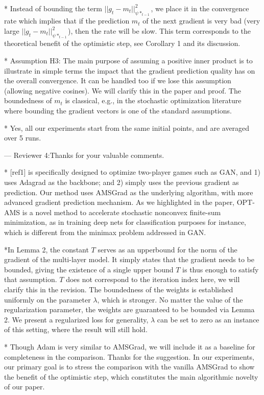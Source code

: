 \documentclass{article}
\begin{document}
* Instead of bounding the term $||g_t  - m_t ||_{\psi*_{t-1}}^2$, we place it in the convergence rate which implies that if the prediction $m_t$ of the next gradient is very bad (very large $||g_t  - m_t ||_{\psi*_{t-1}}^2$), then the rate will be slow. This term corresponds to the theoretical benefit of the optimistic step, see Corollary 1 and its discussion.

* Assumption H3: The main purpose of assuming a positive inner product is to illustrate in simple terms the impact that the gradient prediction quality has on the overall convergence. 
It can be handled too if we lose this assumption (allowing negative cosines). 
We will clarify this in the paper and proof.
The boundedness of $m_t$ is classical, e.g., in the stochastic optimization literature where bounding the gradient vectors is one of the standard assumptions.

* Yes, all our experiments start from the same initial points, and are averaged over 5 runs. 


--- Reviewer 4:Thanks for your valuable comments.

{\color{red} * [ref1] is specifically designed to optimize two-player games such as GAN, and 1) uses Adagrad as the backbone; and 2) simply uses the previous gradient as prediction. Our method uses AMSGrad as the underlying algorithm, with more advanced gradient prediction mechanism. As we highlighted in the paper, OPT-AMS is a novel method to accelerate stochastic nonconvex finite-sum minimization, as in training deep nets for classification purposes for instance, which is different from the minimax problem addressed in GAN.}

*In Lemma 2, the constant $T$ serves as an upperbound for the norm of the gradient of the multi-layer model. It simply states that the gradient needs to be bounded, giving the existence of a single upper bound $T$ is thus enough to satisfy that assumption. $T$ does not correspond to the iteration index here, we will clarify this in the revision.
The boundedness of the weights is established uniformly on the parameter $\lambda$, which is stronger. No matter the value of the regularization parameter, the weights are guaranteed to be bounded via Lemma 2. We present a regularized loss for generality, $\lambda$ can be set to zero as an instance of this setting, where the result will still hold.

* Though Adam is very similar to AMSGrad, we will include it as a baseline for completeness in the comparison. Thanks for the suggestion. In our experiments, our primary goal is to stress the comparison with the vanilla AMSGrad to show the benefit of the optimistic step, which constitutes the main algorithmic novelty of our paper.
\end{document}
